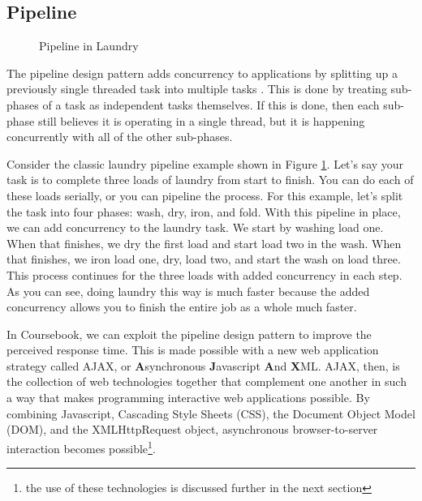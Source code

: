 \subsection{Pipeline}

\begin{figure}[t]
  \begin{center}
  \caption{Pipeline in Laundry}
  \label{fig:laundry}
  \end{center}
\end{figure}

The pipeline design pattern adds concurrency to applications by splitting up a
previously single threaded task into multiple tasks \cite{Vermeulen95}. This is
done by treating sub-phases of a task as independent tasks themselves. If this
is done, then each sub-phase still believes it is operating in a single thread,
but it is happening concurrently with all of the other sub-phases.

Consider the classic laundry pipeline example shown in Figure \ref{fig:laundry}.
Let's say your task is to complete three loads of laundry from start to finish.
You can do each of these loads serially, or you can pipeline the process. For
this example, let's split the task into four phases: wash, dry, iron, and fold. 
With this pipeline in place, we can add concurrency to the laundry task. We
start by washing load one. When that finishes, we dry the first load and start 
load two in the wash. When that finishes, we iron load one, dry, load two, and
start the wash on load three. This process continues for the three loads with 
added concurrency in each step. As you can see, doing laundry this way is much
faster because the added concurrency allows you to finish the entire job as a
whole much faster.

In Coursebook, we can exploit the pipeline design pattern to improve the
perceived response time. This is made possible with a new web application
strategy called AJAX, or \textbf{A}synchronous \textbf{J}avascript \textbf{A}nd
\textbf{X}ML. AJAX, then, is the collection of web technologies together that
complement one another in such a way that makes programming interactive web
applications possible. By combining Javascript, Cascading Style Sheets (CSS), 
the Document Object Model (DOM), and the XMLHttpRequest object, asynchronous
browser-to-server interaction becomes possible\footnote{the use of these
technologies is discussed further in the next section}.

